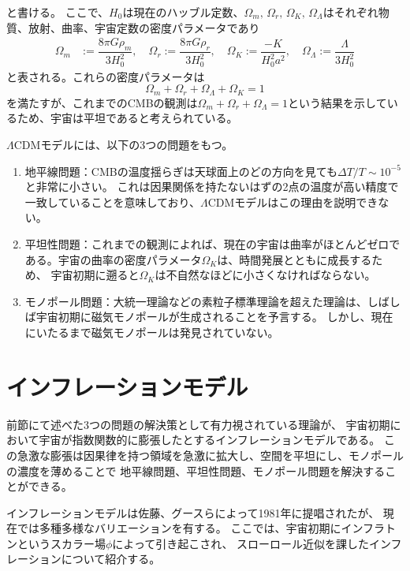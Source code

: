 \documentclass[../../main.tex]{subfiles}
\begin{document}
と書ける。
ここで、$H_0$は現在のハッブル定数、$\Omega_m,\,\Omega_r,\,\Omega_{K},\,\Omega_{\Lambda}$はそれぞれ物質、放射、曲率、宇宙定数の密度パラメータであり
\begin{align}
    \label{eq:omega}
    \Omega_m&:=\dfrac{8\pi G\rho_{m}}{3H_0^2},\quad
    \Omega_r:=\dfrac{8\pi G\rho_{r}}{3H_0^2},\quad
    \Omega_{K}:=\dfrac{-K}{H_0^2a^2},\quad
    \Omega_{\Lambda}:=\dfrac{\Lambda}{3H_0^2}
\end{align}
と表される。これらの密度パラメータは
\begin{equation}
    \label{eq:omegaconstraint}
    \Omega_{m}+\Omega_{r}+\Omega_{\Lambda}+\Omega_{K}=1
\end{equation}
を満たすが、これまでのCMBの観測は$\Omega_{m}+\Omega_{r}+\Omega_{\Lambda}=1$という結果を示しているため、宇宙は平坦であると考えられている\cite{Bennett_2003}。


$\Lambda\mathrm{CDM}$モデルには、以下の3つの問題をもつ。
\begin{enumerate}
    \item 地平線問題：CMBの温度揺らぎは天球面上のどの方向を見ても$\Delta T/T\sim 10^{-5}$と非常に小さい。
    これは因果関係を持たないはずの2点の温度が高い精度で一致していることを意味しており、$\Lambda\mathrm{CDM}$モデルはこの理由を説明できない。
    \item 平坦性問題：これまでの観測によれば、現在の宇宙は曲率がほとんどゼロである。宇宙の曲率の密度パラメータ$\Omega_{K}$は、時間発展とともに成長するため、
    宇宙初期に遡ると$\Omega_{K}$は不自然なほどに小さくなければならない。
    \item モノポール問題：大統一理論などの素粒子標準理論を超えた理論は、しばしば宇宙初期に磁気モノポールが生成されることを予言する。
    しかし、現在にいたるまで磁気モノポールは発見されていない。
\end{enumerate}
\section{インフレーションモデル}
前節にて述べた3つの問題の解決策として有力視されている理論が、
宇宙初期において宇宙が指数関数的に膨張したとするインフレーションモデルである。
この急激な膨張は因果律を持つ領域を急激に拡大し、空間を平坦にし、モノポールの濃度を薄めることで
地平線問題、平坦性問題、モノポール問題を解決することができる。

インフレーションモデルは佐藤、グースらによって1981年に提唱された\cite{10.1093/mnras/195.3.467}\cite{PhysRevD.23.347}が、
現在では多種多様なバリエーションを有する\cite{Tsujikawa_book}。
ここでは、宇宙初期にインフラトンというスカラー場$\phi$によって引き起こされ、
スローロール近似を課したインフレーションについて紹介する。
\end{document}
